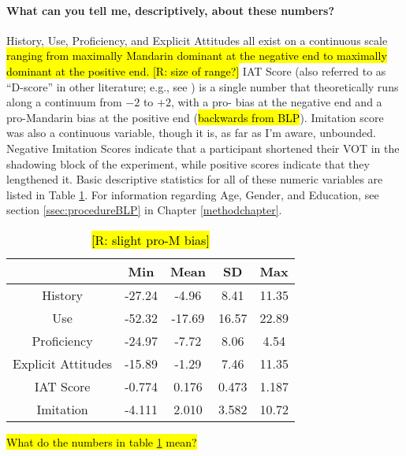 \paragraph{What can you tell me, descriptively, about these numbers?} History, Use, Proficiency, and Explicit Attitudes all exist on a continuous scale \hl{ranging from maximally Mandarin dominant at the negative end to maximally \ND{} dominant at the positive end. [R: size of range?]} IAT Score (also referred to as ``D-score'' in other literature; e.g., see \citealp{greenwald2003understanding}) is a single number that theoretically runs along a continuum from $-2$ to $+2$, with a pro-\ND{} bias at the negative end and a pro-Mandarin bias at the positive end (\hl{backwards from BLP}). Imitation score was also a continuous variable, though it is, as far as I'm aware, unbounded. Negative Imitation Scores indicate that a participant shortened their VOT in the shadowing block of the experiment, while positive scores indicate that they lengthened it. Basic descriptive statistics for all of these numeric variables are listed in Table \ref{tab:PredDescStats}. For information regarding Age, Gender, and Education, see section \ref{ssec:procedureBLP} in Chapter \ref{methodchapter}.

\begin{table}
    \centering
    \begin{tabular}{|c|c|c|c|c|}
    \hline
         & Min & Mean & SD & Max \\
    \hline
        History & -27.24 & -4.96 & 8.41 & 11.35 \\
    \hline
        Use & -52.32 & -17.69 & 16.57 & 22.89 \\
    \hline
        Proficiency & -24.97 & -7.72 & 8.06 & 4.54 \\
    \hline
        Explicit Attitudes & -15.89 & -1.29 & 7.46 & 11.35 \\
    \hline
        IAT Score & -0.774 & 0.176 & 0.473 & 1.187 \\
    \hline
        Imitation & -4.111 & 2.010 & 3.582 & 10.72 \\
    \hline
    \end{tabular}
    \caption{\hl{[R: slight pro-M bias]}}
    \label{tab:PredDescStats}
\end{table}

\hl{What do the numbers in table \ref{tab:PredDescStats} mean?}

